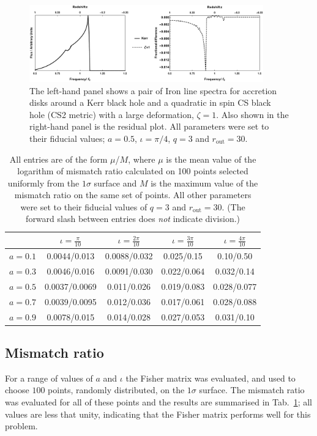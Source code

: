 \begin{figure}[t]
 \centering
 \includegraphics[trim=0cm 0cm 0cm 0cm, width=0.9\textwidth]{CS2IronLines.pdf}
 \caption{The left-hand panel shows a pair of Iron line spectra for accretion disks around a Kerr black hole and a quadratic in spin CS black hole (CS2 metric) with a large deformation, $\zeta=1$. Also shown in the right-hand panel is the residual plot. All parameters were set to their fiducial values; $a=0.5$, $\iota=\pi/4$, $q=3$ and $r_{\textrm{out}}=30$.}
 \label{fig:CS1IronLines}
\end{figure}

\begin{table}[h]
\begin{center}
\begin{tabular}{ l | c c c c }
	&$\iota=\frac{\pi}{10}$&$\iota=\frac{2\pi}{10}$&$\iota=\frac{3\pi}{10}$&$\iota=\frac{4\pi}{10}$\\
\hline
$a=0.1$ & 0.0044/0.013	& 0.0088/0.032	& 0.025/0.15	& 0.10/0.50	\\
$a=0.3$ & 0.0046/0.016	& 0.0091/0.030	& 0.022/0.064	& 0.032/0.14	\\
$a=0.5$ & 0.0037/0.0069	& 0.011/0.026	& 0.019/0.083	& 0.028/0.077	\\
$a=0.7$ & 0.0039/0.0095	& 0.012/0.036	& 0.017/0.061	& 0.028/0.088	\\
$a=0.9$ & 0.0078/0.015	& 0.014/0.028	& 0.027/0.053	& 0.031/0.10	\\
\end{tabular}
\end{center}
\caption{All entries are of the form $\mu$/$M$, where $\mu$ is the mean value of the logarithm of mismatch ratio calculated on 100 points selected uniformly from the $1\sigma$ surface and $M$ is the maximum value of the mismatch ratio on the same set of points. All other parameters were set to their fiducial values of $q=3$ and $r_{\textrm{out}}=30$. (The forward slash between entries does \emph{not} indicate division.)}
\label{tab:val}
\end{table}


\subsection{Mismatch ratio}\label{subsubsec:val}
For a range of values of $a$ and $\iota$ the Fisher matrix was evaluated, and used to choose $100$ points, randomly distributed, on the $1\sigma$ surface. The mismatch ratio was evaluated for all of these points and the results are summarised in Tab.\ \ref{tab:val}; all values are less that unity, indicating that the Fisher matrix performs well for this problem.

